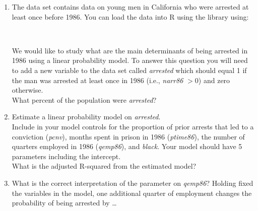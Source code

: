\begin{enumerate}
\item {}
The data set  contains data on young men in California who were arrested at least once before 1986. You can load the data into R using the  library using:

\medskip
{}\\
\medskip

We would like to study what are the main determinants of being arrested in 1986 using a linear probability model. To answer this question you will need to add a new variable to the data set called \textit{arrested} which should equal 1 if the man was arrested at least once in 1986 (i.e., \textit{narr86} $>0$) and zero otherwise.\\
What percent of the population were \textit{arrested}?

\item Estimate a linear probability model on \textit{arrested}.\\
Include in your model controls for the proportion of prior arrests that led to a conviction (\textit{pcnv}), months spent in prison in 1986 (\textit{ptime86}), the number of quarters employed in 1986 (\textit{qemp86}), and \textit{black}. Your model should have 5 parameters including the intercept.\\
What is the adjusted R-squared from the estimated model?

\item What is the correct interpretation of the parameter on \textit{qemp86}? Holding fixed the variables in the model, one additional quarter of employment changes the probability of being arrested by \dots
{}


\end{enumerate}
